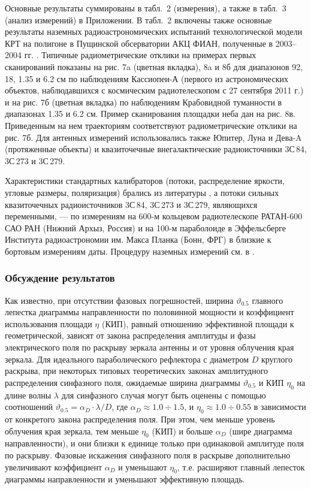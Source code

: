 Основные результаты суммированы в табл.~2 (измерения), а также в табл.~3 (анализ измерений) в
Приложении. В табл.~2 включены также основные результаты наземных радиоастрономических испытаний
технологической модели КРТ на полигоне в Пущинской обсерватории АКЦ ФИАН, полученные в 2003--2004
гг. \cite{SRT_report_2004}. Типичные радиометрические отклики на примерах первых сканирований
показаны на рис. 7a (цветная вкладка), 8a и 8б для диапазонов 92, 18, 1.35 и 6.2 см по наблюдениям
Кассиопеи-А (первого из астрономических объектов, наблюдавшихся с космическим радиотелескопом с 27
сентября 2011 г.) и на рис. 7б (цветная вкладка) по наблюдениям Крабовидной туманности в диапазонах
1.35 и 6.2 см. Пример сканирования площадки неба дан на рис. 8в. Приведенным на нем траекториям
соответствуют радиометрические отклики на рис. 7б. Для антенных измерений использовались также
Юпитер, Луна и Дева-A (протяженные объекты) и квазиточечные внегалактические радиоисточники 3С\,84,
3С\,273 и 3С\,279.

Характеристики  стандартных калибраторов (потоки, распределение яркости, угловые размеры,
поляризация) брались из литературы \cite{Baars_1977}, а потоки сильных квазиточечных радиоисточников
3С\,84, 3С\,273 и 3С\,279, являющихся переменными, --- по измерениям на 600-м кольцевом
радиотелескопе РАТАН-600 САО РАН (Нижний Архыз, Россия) и на 100-м параболоиде в Эффельсберге
Института радиоастрономии им. Макса Планка (Бонн, ФРГ) \cite{} в близкие к бортовым
измерениям даты. Процедуру наземных измерений см. в \cite{Kovalev_1999}.


\subsubsection{Обсуждение результатов}

Как известно, при отсутствии фазовых погрешностей, ширина $\vartheta_{0.5}$ главного лепестка
диаграммы направленности по половинной мощности и коэффициент использования площади $\eta$ (КИП),
равный отношению эффективной площади к геометрической, зависят от закона распределения амплитуды и
фазы электрического поля по раскрыву зеркала антенны и от уровня облучения края зеркала. Для
идеального параболического рефлектора с диаметром $D$ круглого раскрыва, при некоторых типовых
теоретических законах амплитудного распределения синфазного поля, ожидаемые ширина диаграммы
$\vartheta_{0.5}$ и КИП $\eta_0$ на длине волны $\lambda$ для синфазного случая могут быть оценены с
помощью соотношений \cite{Hansen_1966,Ajzenberg_1977,Christiansen_1972} $\vartheta_{0.5} = \alpha_D
\cdot \lambda / D$, где $\alpha_D \approx 1.0 \div 1.5$, и $\eta_0 \approx 1.0 \div 0.55$ в
зависимости от конкретого закона распределения поля. При этом, чем меньше уровень облучения края
зеркала, тем меньше $\eta_0$ (КИП) и больше $\alpha_D$ (шире диаграмма направленности), и они близки
к единице только при одинаковой амплитуде поля по раскрыву. Фазовые искажения синфазного поля в
раскрыве дополнительно увеличивают коэффициент $\alpha_D$ и уменьшают $\eta_0$, т.е. расширяют
главный лепесток диаграммы направленности и уменьшают эффективную площадь.

